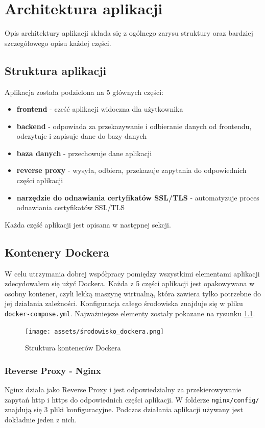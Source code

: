 \documentclass[shortabstract]{iithesis}
\begin{document}
\chapter{Architektura aplikacji}
Opis architektury aplikacji składa się z ogólnego zarysu struktury oraz bardziej szczegółowego opisu każdej części.
\section{Struktura aplikacji}
Aplikacja została podzielona na 5 głównych części:
\begin{itemize}
    \item \textbf{frontend} - cześć aplikacji widoczna dla użytkownika
    \item \textbf{backend} - odpowiada za przekazywanie i odbieranie danych od frontendu, odczytuje i zapisuje dane do bazy danych
    \item \textbf{baza danych} - przechowuje dane aplikacji
    \item \textbf{reverse proxy} - wysyła, odbiera, przekazuje zapytania do odpowiednich części aplikacji
    \item \textbf{narzędzie do odnawiania certyfikatów SSL/TLS} - automatyzuje proces odnawiania certyfikatów SSL/TLS
\end{itemize}
Każda część aplikacji jest opisana w następnej sekcji.

\section{Kontenery Dockera}
W celu utrzymania dobrej współpracy pomiędzy wszystkimi elementami aplikacji zdecydowałem się użyć Dockera\cite{Docker}.
Każda z 5 części aplikacji jest opakowywana w osobny kontener, czyli lekką maszynę wirtualną, która zawiera tylko potrzebne do jej działania zależności.
Konfiguracja całego środowiska znajduje się w pliku \texttt{docker-compose.yml}. Najważniejsze elementy zostały pokazane na rysunku \ref{fig:docker_containers_environment}.

\begin{figure}[H]
    \centering
    \texttt{[image: assets/środowisko\_dockera.png]}
    \caption{Struktura kontenerów Dockera}
    \label{fig:docker_containers_environment}
\end{figure}

\subsection{Reverse Proxy - Nginx}
Nginx\cite{Nginx} działa jako Reverse Proxy i jest odpowiedzialny za przekierowywanie zapytań http i https do odpowiednich części aplikacji.
W folderze \texttt{nginx/config/} znajdują się 3 pliki konfiguracyjne. Podczas działania aplikacji używany jest dokładnie jeden z nich.
\end{document}
